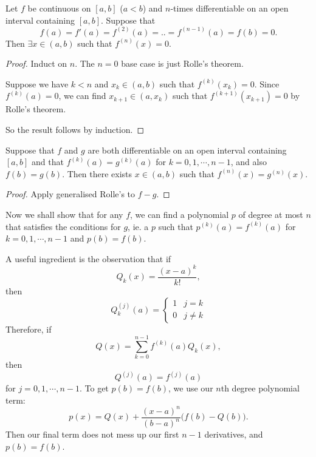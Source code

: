 \documentclass[a4paper]{article}
\begin{document}
\begin{thm}
  Let $f$ be continuous on $[a, b]$ ($a < b$) and $n$-times differentiable on an open interval containing $[a, b]$. Suppose that
  \[
    f(a) = f'(a) = f^{(2)}(a) = .. = f^{(n - 1)}(a) = f(b) = 0.
  \]
  Then $\exists x\in (a, b)$ such that $f^{(n)}(x) = 0$.
\end{thm}

\begin{proof}
  Induct on $n$. The $n = 0$ base case is just Rolle's theorem.

  Suppose we have $k < n$ and $x_k\in (a, b)$ such that $f^{(k)}(x_k) = 0$. Since $f^{(k)}(a) = 0$, we can find $x_{k + 1}\in (a, x_k)$ such that $f^{(k + 1)}(x_{k + 1}) = 0$ by Rolle's theorem.

  So the result follows by induction.
\end{proof}

\begin{cor}
  Suppose that $f$ and $g$ are both differentiable on an open interval containing $[a, b]$ and that $f^{(k)}(a) = g^{(k)}(a)$ for $k = 0, 1, \cdots, n - 1$, and also $f(b) = g(b)$. Then there exists $x\in (a, b)$ such that $f^{(n)}(x) = g^{(n)}(x)$.
\end{cor}

\begin{proof}
  Apply generalised Rolle's to $f - g$.
\end{proof}

Now we shall show that for any $f$, we can find a polynomial $p$ of degree at most $n$ that satisfies the conditions for $g$, ie. a $p$ such that $p^{(k)}(a) = f^{(k)}(a)$ for $k = 0, 1, \cdots, n - 1$ and $p(b) = f(b)$.

A useful ingredient is the observation that if
\[
  Q_k(x) = \frac{(x - a)^k}{k!},
\]
then
\[
  Q_k^{(j)}(a) =
  \begin{cases}
    1 & j = k\\
    0 & j \not= k
  \end{cases}
\]
Therefore, if
\[
  Q(x) = \sum_{k = 0}^{n - 1}f^{(k)}(a) Q_k(x),
\]
then
\[
  Q^{(j)}(a) = f^{(j)}(a)
\]
for $j = 0, 1, \cdots, n - 1$. To get $p(b) = f(b)$, we use our $n$th degree polynomial term:
\[
  p(x) = Q(x) + \frac{(x - a)^n}{(b - a)^n}\big(f(b) - Q(b)\big).
\]
Then our final term does not mess up our first $n - 1$ derivatives, and $p(b)=  f(b)$.
\end{document}
